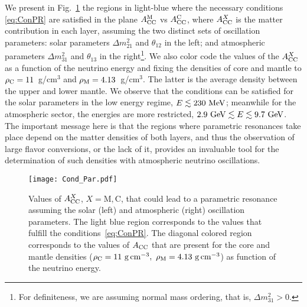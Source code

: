 We present in Fig.~\ref{fig:ConPR} the regions in light-blue where the necessary conditions \eqref{eq:ConPR} are satisfied in the plane $A_{\rm CC}^{\rm M}$ vs $A_{\rm CC}^{\rm C}$, where $A^X_{\rm CC}$ is the matter contribution in each layer, assuming the two distinct sets of oscillation parameters: solar parameters $\Delta m_{21}^2$ and $\theta_{12}$ in the left; and atmospheric parameters $\Delta m_{31}^2$ and $\theta_{13}$ in the right\footnote{For definiteness, we are assuming normal mass ordering, that is, $\Delta m^2_{31}>0$.}. 
We also color code the values of the $A_{\rm CC}^X$ as a function of the neutrino energy and fixing the densities of core and mantle to $\rho_{\rm C}=11$~g/cm$^3$ and $\rho_{\rm M}=4.13$~g/cm$^3$.
The latter is the average density between the upper and lower mantle. 
We observe that the conditions can be satisfied for the solar parameters in the low energy regime, $E\lesssim 230~{\rm MeV}$; meanwhile for the atmospheric sector, the energies are more restricted, $2.9~{\rm GeV}\lesssim E \lesssim 9.7~{\rm GeV}$.
The important message here is that the regions where parametric resonances take place depend on the matter densities of both layers, and thus the observation of large flavor conversions, or the lack of it, provides an invaluable tool for the determination of such densities with atmospheric neutrino oscillations.
\begin{figure}[t]
\begin{center}
\texttt{[image: Cond\_Par.pdf]}
\caption{Values of $A_{\rm CC}^X$, $X=\mathrm{M,C}$, that could lead to a parametric resonance assuming the solar (left) and atmospheric (right) oscillation parameters. The light blue region corresponds to the values that fulfill the conditions~\eqref{eq:ConPR}. The diagonal colored region corresponds to the values of $A_{\rm CC}$ that are present for the core and mantle densities ($\rho_{\rm C}=11~{\rm g \,cm^{-3}},\ \rho_{\rm M}=4.13~{\rm g \,cm^{-3}}$)  as function of the neutrino energy. \label{fig:ConPR}} 
\end{center}
\end{figure}

